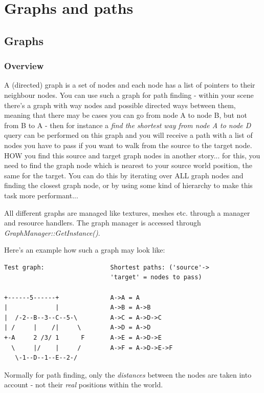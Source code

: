 \chapter{Graphs and paths}




\section{Graphs}


\subsection{Overview}
A (directed) graph is a set of nodes and each node has a list of pointers to their neighbour nodes. You can use such a graph for path finding - within your scene there's a graph with way nodes and possible directed ways between them, meaning that there may be cases you can go from node A to node B, but not from B to A - then for instance a \emph{find the shortest way from node A to node D} query can be performed on this graph and you will receive a path with a list of nodes you have to pass if you want to walk from the source to the target node. HOW you find this source and target graph nodes in another story... for this, you need to find the graph node which is nearest to your source world position, the same for the target. You can do this by iterating over ALL graph nodes and finding the closest graph node, or by using some kind of hierarchy to make this task more performant...

All different graphs are managed like textures, meshes etc. through a manager and resource handlers. The graph manager is accessed through \emph{GraphManager::GetInstance()}.

Here's an example how such a graph may look like:

\begin{lstlisting}[caption=Graph example]
Test graph:                  Shortest paths: ('source'->
                             'target' = nodes to pass)

+------5------+              A->A = A
|             |              A->B = A->B
|  /-2--B--3--C--5-\         A->C = A->D->C
| /     |    /|     \        A->D = A->D
+-A     2 /3/ 1      F       A->E = A->D->E
  \     |/    |     /        A->F = A->D->E->F
   \-1--D--1--E--2-/

\end{lstlisting}

Normally for path finding, only the \emph{distances} between the nodes are taken into account - not their \emph{real} positions within the world.




